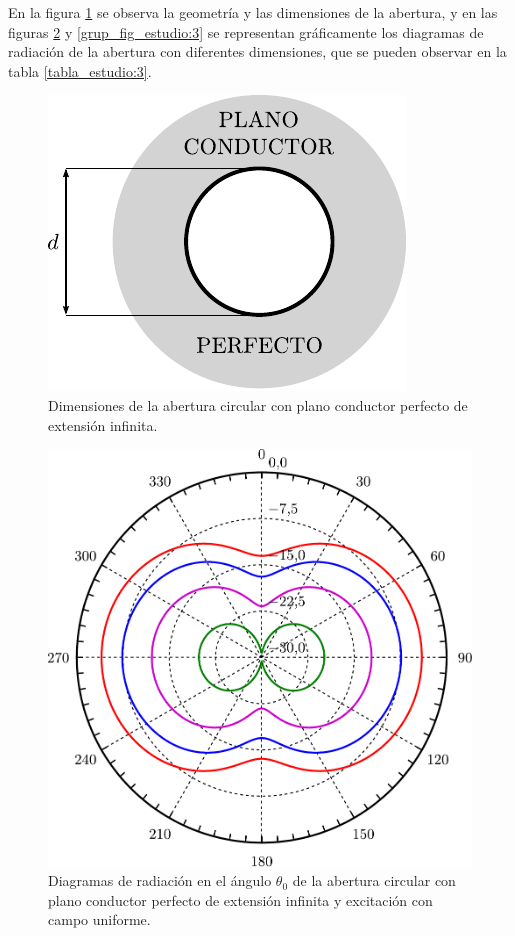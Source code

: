 En la figura \ref{fig_estudio:9} se observa la geometría y las dimensiones de la abertura, y en las figuras \ref{fig_estudio:10} y \ref{grup_fig_estudio:3} se representan gráficamente los diagramas de radiación de la abertura con diferentes dimensiones, que se pueden observar en la tabla \ref{tabla_estudio:3}.
\begin{figure}[H]
\centering
\includegraphics[scale = 1]{Figures/Estudio/estudio_9}
\caption{Dimensiones de la abertura circular con plano conductor perfecto de extensión infinita.}
\label{fig_estudio:9}
\end{figure}
\begin{figure}[H]
\centering
\includegraphics[scale = 0.5]{Figures/Estudio/estudio_10}
\caption{Diagramas de radiación en el ángulo $\theta_0$ de la abertura circular con plano conductor perfecto de extensión infinita y excitación con campo uniforme.}
\label{fig_estudio:10}
\end{figure}
